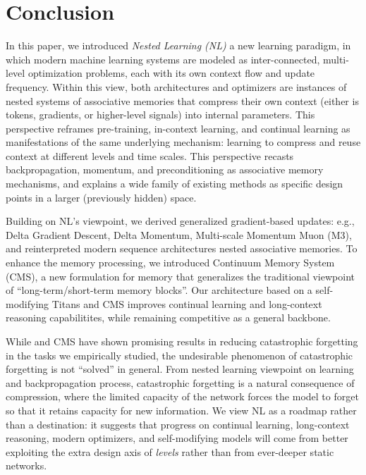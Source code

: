 \section{Conclusion}\label{sec:concolusion}
In this paper, we introduced \emph{Nested Learning (NL)} a new learning paradigm, in which modern machine learning systems are modeled as inter-connected, multi-level optimization problems, each with its own context flow and update frequency. Within this view, both architectures and optimizers are instances of nested systems of associative memories that compress their own context (either is tokens, gradients, or higher-level signals) into internal parameters. This perspective reframes pre-training, in-context learning, and continual learning as manifestations of the same underlying mechanism: learning to compress and reuse context at different levels and time scales. This perspective recasts backpropagation, momentum, and preconditioning as associative memory mechanisms, and explains a wide family of existing methods as specific design points in a larger (previously hidden) space.


Building on NL's viewpoint, we derived generalized gradient-based updates: e.g., Delta Gradient Descent, Delta Momentum, Multi-scale Momentum Muon (M3), and reinterpreted modern sequence architectures nested associative memories. To enhance the memory processing, we introduced Continuum Memory System (CMS), a new formulation for memory that generalizes the traditional viewpoint of ``long-term/short-term memory blocks''. Our \model{} architecture based on a self-modifying Titans and CMS improves continual learning and long-context reasoning capabilitites, while remaining competitive as a general backbone.






While \model{} and CMS have shown promising results in reducing catastrophic forgetting in the tasks we empirically studied, the undesirable phenomenon of catastrophic forgetting is not ``solved''  in general. From nested learning viewpoint on learning and backpropagation process, catastrophic forgetting is a natural consequence of compression, where the limited capacity of the network forces the model to forget so that it retains capacity for new information. We view NL as a roadmap rather than a destination: it suggests that progress on continual learning, long-context reasoning, modern optimizers, and self-modifying models will come from better exploiting the extra design axis of \emph{levels} rather than from ever-deeper static networks. 

